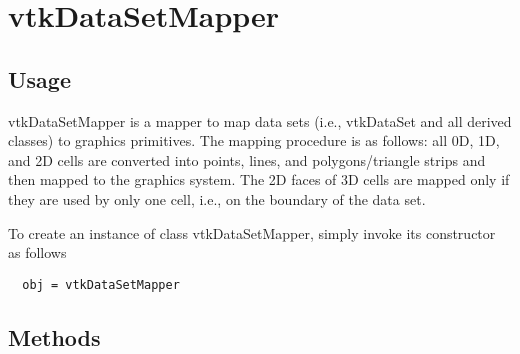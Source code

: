 \section{vtkDataSetMapper}

\subsection{Usage}

 vtkDataSetMapper is a mapper to map data sets (i.e., vtkDataSet and 
 all derived classes) to graphics primitives. The mapping procedure
 is as follows: all 0D, 1D, and 2D cells are converted into points,
 lines, and polygons/triangle strips and then mapped to the graphics 
 system. The 2D faces of 3D cells are mapped only if they are used by 
 only one cell, i.e., on the boundary of the data set.

To create an instance of class vtkDataSetMapper, simply
invoke its constructor as follows
\begin{verbatim}
  obj = vtkDataSetMapper
\end{verbatim}
\subsection{Methods}

